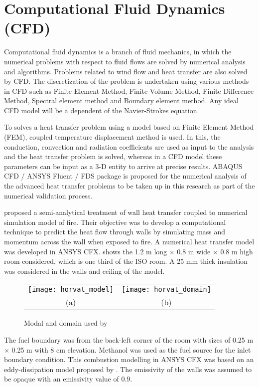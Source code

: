 \section{Computational Fluid Dynamics (CFD)}

Computational fluid dynamics is a branch of fluid mechanics, in which the numerical problems with respect to fluid flows are solved by numerical analysis and algorithms. Problems related to wind flow and heat transfer are also solved by CFD. The discretization of the problem is undertaken using various methods in CFD such as Finite Element Method, Finite Volume Method, Finite Difference Method, Spectral element method and Boundary element method. Any ideal CFD model will be a dependent of the Navier-Strokes equation.  

To solves a heat transfer problem using a model based on Finite Element Method (FEM), coupled temperature displacement method is used. In this, the conduction, convection and radiation coefficients are used as input to the analysis and the heat transfer problem is solved, whereas in a CFD model these parameters can be input as a 3-D entity to arrive at precise results. ABAQUS CFD / ANSYS Fluent / FDS package is proposed for the numerical analysis of the advanced heat transfer problems to be taken up in this research as part of the numerical validation process.

\citet{Horvat2009} proposed a semi-analytical treatment of wall heat transfer coupled to numerical simulation model of fire. Their objective was to develop a computational technique to predict the heat flow through walls by simulating mass and momentum across the wall when exposed to fire. A numerical heat transfer model was developed in ANSYS CFX.  shows the 1.2 m long $\times$ 0.8 m wide $\times$ 0.8 m high room considered, which is one third of the ISO room. A 25 mm thick insulation was considered in the walls and ceiling of the model.
\begin{figure}[htbp]
	\centering
		\begin{tabular}{cc}
			\texttt{[image: horvat\_model]} &
			\texttt{[image: horvat\_domain]} \\ 
			(a) & (b) \\ 
		\end{tabular} 
		\caption{Modal and domain used by \citet{Horvat2009}}
		\label{fig:horvat_model}
\end{figure}

The fuel boundary was from the back-left corner of the room with sizes of 0.25 m $\times$ 0.25 m with 8 cm elevation. Methanol was used as the fuel source for the inlet boundary condition. This combustion modelling in ANSYS CFX was based on an eddy-dissipation model proposed by \citet{Magnussen1977}. The emissivity of the walls was assumed to be opaque with an emissivity value of 0.9.

